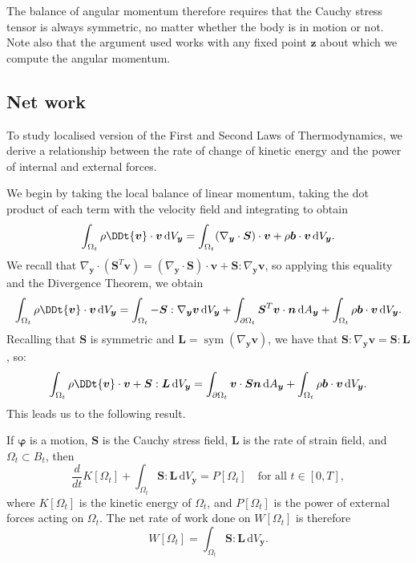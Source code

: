 \documentclass[
  letterpaper,
  DIV=11,
  numbers=noendperiod]{scrreprt}
\theoremstyle{plain}
\theoremstyle{remark}
\begin{document}
The balance of angular momentum therefore requires that the Cauchy
stress tensor is always symmetric, no matter whether the body is in
motion or not. Note also that the argument used works with any fixed
point \({\boldsymbol{z}}\) about which we compute the angular momentum.

\subsection{Net work}\label{net-work}

To study localised version of the First and Second Laws of
Thermodynamics, we derive a relationship between the rate of change of
kinetic energy and the power of internal and external forces.

We begin by taking the local balance of linear momentum, taking the dot
product of each term with the velocity field and integrating to obtain
\[\int_{\Omega_t}\rho\DDt{\boldsymbol{v}}\cdot{\boldsymbol{v}}{\,{\mathrm{d}}V_{{\boldsymbol{y}}}}= \int_{\Omega_t}(\nabla_{\boldsymbol{y}}\cdot{\boldsymbol{S}})\cdot{\boldsymbol{v}}+\rho{\boldsymbol{b}}\cdot{\boldsymbol{v}}{\,{\mathrm{d}}V_{{\boldsymbol{y}}}}.\]
We recall that
\(\nabla_{\boldsymbol{y}}\cdot({\boldsymbol{S}}^T{\boldsymbol{v}}) = (\nabla_{\boldsymbol{y}}\cdot{\boldsymbol{S}})\cdot{\boldsymbol{v}}+{\boldsymbol{S}}:\nabla_{\boldsymbol{y}}{\boldsymbol{v}}\),
so applying this equality and the Divergence Theorem, we obtain
\[\int_{\Omega_t}\rho\DDt{\boldsymbol{v}}\cdot{\boldsymbol{v}}{\,{\mathrm{d}}V_{{\boldsymbol{y}}}}= \int_{\Omega_t}-{\boldsymbol{S}}:\nabla_{\boldsymbol{y}}{\boldsymbol{v}}{\,{\mathrm{d}}V_{{\boldsymbol{y}}}}+\int_{\partial\Omega_t}{\boldsymbol{S}}^T{\boldsymbol{v}}\cdot{\boldsymbol{n}}{\,{\mathrm{d}}A_{{\boldsymbol{y}}}}+\int_{\Omega_t}\rho{\boldsymbol{b}}\cdot{\boldsymbol{v}}{\,{\mathrm{d}}V_{{\boldsymbol{y}}}}.\]
Recalling that \({\boldsymbol{S}}\) is symmetric and
\({\boldsymbol{L}}= {\operatorname{sym}}(\nabla_{\boldsymbol{y}}{\boldsymbol{v}})\),
we have that
\({\boldsymbol{S}}:\nabla_{\boldsymbol{y}}{\boldsymbol{v}}= {\boldsymbol{S}}:{\boldsymbol{L}}\),
so:
\[\int_{\Omega_t}\rho\DDt{\boldsymbol{v}}\cdot{\boldsymbol{v}}+{\boldsymbol{S}}:{\boldsymbol{L}}{\,{\mathrm{d}}V_{{\boldsymbol{y}}}}= \int_{\partial\Omega_t}{\boldsymbol{v}}\cdot{\boldsymbol{S}}{\boldsymbol{n}}{\,{\mathrm{d}}A_{{\boldsymbol{y}}}}+\int_{\Omega_t}\rho{\boldsymbol{b}}\cdot{\boldsymbol{v}}{\,{\mathrm{d}}V_{{\boldsymbol{y}}}}.\]
This leads us to the following result.

If \({\boldsymbol{\varphi}}\) is a motion, \({\boldsymbol{S}}\) is the
Cauchy stress field, \({\boldsymbol{L}}\) is the rate of strain field,
and \(\Omega_t\subset B_t\), then
\[\frac{d}{dt}K[\Omega_t]+\int_{\Omega_t} {\boldsymbol{S}}:{\boldsymbol{L}}{\,{\mathrm{d}}V_{{\boldsymbol{y}}}}= P[\Omega_t]\quad\text{for all }t\in[0,T],\]
where \(K[\Omega_t]\) is the kinetic energy of \(\Omega_t\), and
\(P[\Omega_t]\) is the power of external forces acting on \(\Omega_t\).
The net rate of work done on \(W[\Omega_t]\) is therefore
\[W[\Omega_t] = \int_{\Omega_t} {\boldsymbol{S}}:{\boldsymbol{L}}{\,{\mathrm{d}}V_{{\boldsymbol{y}}}}.\]
\end{document}
